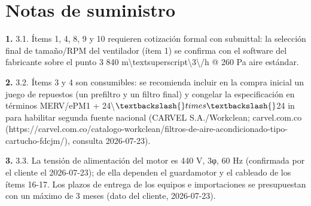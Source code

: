 \documentclass[11pt,a4paper,landscape]{article}
\begin{document}
\vspace{0.5cm}

\section*{Notas de suministro}
\noindent \textbf{1.} 3.1. Ítems 1, 4, 8, 9 y 10 requieren cotización formal con submittal: la selección final de tamaño/RPM del ventilador (ítem 1) se confirma con el software del fabricante sobre el punto 3 840 m\textbackslash{}textsuperscript\textbackslash{}{3\textbackslash{}}/h @ 260 Pa aire estándar.

\noindent \textbf{2.} 3.2. Ítems 3 y 4 son consumibles: se recomienda incluir en la compra inicial un juego de repuestos (un prefiltro y un filtro final) y congelar la especificación en términos MERV/ePM1 + 24\textbackslash{}$\textbackslash{}times\textbackslash{}$24 in para habilitar segunda fuente nacional (CARVEL S.A./Workclean; carvel.com.co (https://carvel.com.co/catalogo-workclean/filtros-de-aire-acondicionado-tipo-cartucho-fdcjm/), consulta 2026-07-23).

\noindent \textbf{3.} 3.3. La tensión de alimentación del motor es 440 V, 3φ, 60 Hz (confirmada por el cliente el 2026-07-23); de ella dependen el guardamotor y el cableado de los ítems 16-17. Los plazos de entrega de los equipos e importaciones se presupuestan con un máximo de 3 meses (dato del cliente, 2026-07-23).
\end{document}
